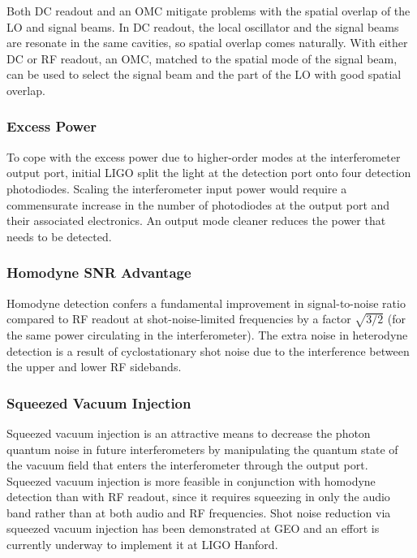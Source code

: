 Both DC readout and an OMC mitigate problems with the spatial overlap
of the LO and signal beams.  In DC readout, the local oscillator and
the signal beams are resonate in the same cavities, so spatial overlap
comes naturally.  With either DC or RF readout, an OMC, matched to the
spatial mode of the signal beam, can be used to select the signal beam
and the part of the LO with good spatial overlap.

\subsubsection*{Excess Power}
To cope with the excess power due to higher-order modes at the
interferometer output port, initial LIGO split the light at the
detection port onto four detection photodiodes.  Scaling the
interferometer input power would require a commensurate increase in
the number of photodiodes at the output port and their associated
electronics.  An output mode cleaner reduces the power that needs to
be detected.

\subsubsection*{Homodyne SNR Advantage} 
Homodyne detection confers a fundamental improvement in
signal-to-noise ratio compared to RF readout at shot-noise-limited
frequencies by a factor $\sqrt{3/2}$ (for the same power circulating
in the interferometer).  The extra noise in heterodyne detection is a
result of cyclostationary shot noise\cite{Niebauer1991Nonstationary}
due to the interference between the upper and lower RF sidebands.

\subsubsection*{Squeezed Vacuum Injection} 
Squeezed vacuum injection is an attractive means to decrease the
photon quantum noise in future interferometers by manipulating the
quantum state of the vacuum field that enters the interferometer
through the output port.  Squeezed vacuum injection is more feasible
in conjunction with homodyne detection than with RF readout, since it
requires squeezing in only the audio band rather than at both audio
and RF frequencies\cite{GeaBanacloche1987Squeezed,
  Chelkowski2007Coherent}.  Shot noise reduction via squeezed vacuum
injection has been demonstrated at GEO\cite{GeoSqueezingNature2011}
and an effort is currently underway to implement it at LIGO
Hanford\cite{H1SqueezerProposal}.

